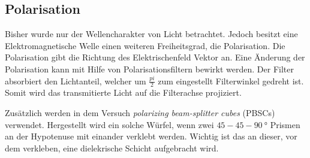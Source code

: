 \subsection{Polarisation}
Bisher wurde nur der Wellencharakter von Licht betrachtet. Jedoch besitzt eine
Elektromagnetische Welle einen weiteren Freiheitsgrad, die Polarisation.
Die Polarisation gibt die Richtung des Elektrischenfeld Vektor an.
Eine Änderung der Polarisation kann mit Hilfe von Polarisationsfiltern bewirkt werden.
Der Filter absorbiert den Lichtanteil, welcher um $\frac{pi}{2}$ zum eingestellt Filterwinkel
gedreht ist. Somit wird das transmitierte Licht auf die Filterachse projiziert.

Zusätzlich werden in dem Versuch \emph{polarizing beam-splitter cubes} (PBSCs) verwendet.
Hergestellt wird ein solche Würfel, wenn zwei $45-45-\SI{90}{\degree}$ Prismen
an der Hypotenuse mit einander verklebt werden. Wichtig ist das an dieser, vor dem verkleben,
eine dielekrische Schicht aufgebracht wird.
